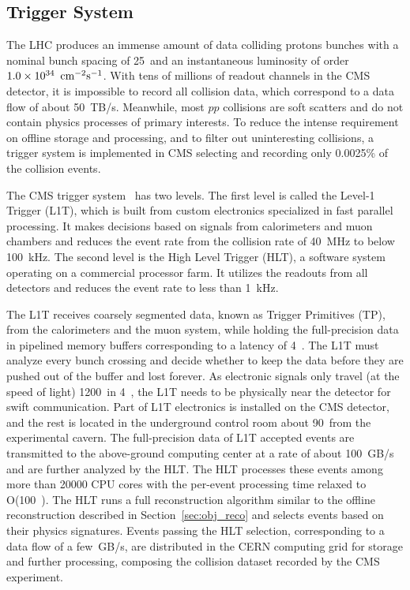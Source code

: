 \subsection{Trigger System}\label{sec:trigger}

The LHC produces an immense amount of data colliding protons bunches with a nominal bunch spacing of 25~\ns and an instantaneous luminosity of order $1.0 \times 10^{34}~\,\text{cm}^{-2}\text{s}^{-1}$. 
With tens of millions of readout channels in the CMS detector, it is impossible to record all collision data, which correspond to a data flow of about 50~TB/s. 
Meanwhile, most $pp$ collisions are soft scatters and do not contain physics processes of primary interests.
To reduce the intense requirement on offline storage and processing, and to filter out uninteresting collisions,
a trigger system is implemented in CMS selecting and recording only 0.0025\% of the collision events.

The CMS trigger system~\cite{Collaboration_2008, l1t_perform} has two levels. 
The first level is called the Level-1 Trigger (L1T), which is built from custom electronics specialized in fast parallel processing.
It makes decisions based on signals from calorimeters and muon chambers and reduces the event rate from the collision rate of 40~MHz to below 100~kHz.
The second level is the High Level Trigger (HLT), a software system operating on a commercial processor farm.
It utilizes the readouts from all detectors and reduces the event rate to less than 1~kHz. 

The L1T receives coarsely segmented data, known as Trigger Primitives (TP), from the calorimeters and the muon system, 
while holding the full-precision data in pipelined memory buffers corresponding to a latency of 4~\mus.
The L1T must analyze every bunch crossing and decide whether to keep the data before they are pushed out of the buffer and lost forever.
As electronic signals only travel (at the speed of light) 1200~\meter in 4~\mus, the L1T needs to be physically near the detector for swift communication.
Part of L1T electronics is installed on the CMS detector, and the rest is located in the underground control room about 90~\meter from the experimental cavern.
The full-precision data of L1T accepted events are transmitted to the above-ground computing center at a rate of about 100~GB/s and are further analyzed by the HLT. 
The HLT processes these events among more than 20000 CPU cores with the per-event processing time relaxed to O(100~\ms).
The HLT runs a full reconstruction algorithm similar to the offline reconstruction described in Section~\ref{sec:obj_reco}
and selects events based on their physics signatures. 
Events passing the HLT selection, corresponding to a data flow of a few~GB/s, 
are distributed in the CERN computing grid for storage and further processing,
composing the collision dataset recorded by the CMS experiment. 

